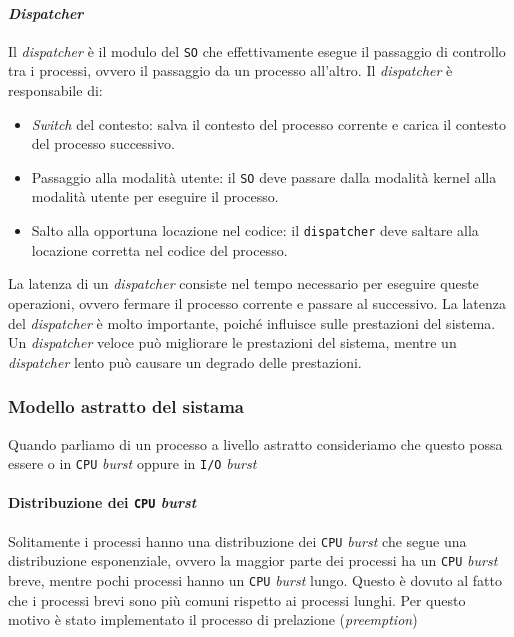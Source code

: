     \paragraph{\textit{Dispatcher}} Il \textit{dispatcher} è il modulo del \texttt{SO} che effettivamente esegue il passaggio di controllo tra i processi, ovvero il passaggio da un processo all'altro. Il \textit{dispatcher} è responsabile di:
    \begin{itemize}
        \item \textit{Switch} del contesto: salva il contesto del processo corrente e carica il contesto del processo successivo.
        \item Passaggio alla modalità utente: il \texttt{SO} deve passare dalla modalità kernel alla modalità utente per eseguire il processo.
        \item Salto alla opportuna locazione nel codice: il \texttt{dispatcher} deve saltare alla locazione corretta nel codice del processo.
    \end{itemize}
    La latenza di un \textit{dispatcher} consiste nel tempo necessario per eseguire queste operazioni, ovvero fermare il processo corrente e passare al successivo. La latenza del \textit{dispatcher} è molto importante, poiché influisce sulle prestazioni del sistema. Un \textit{dispatcher} veloce può migliorare le prestazioni del sistema, mentre un \textit{dispatcher} lento può causare un degrado delle prestazioni.
    \subsubsection{Modello astratto del sistama} 
        Quando parliamo di un processo a livello astratto consideriamo che questo possa essere o in \texttt{CPU} \textit{burst} oppure in \texttt{I/O} \textit{burst}
        \paragraph{Distribuzione dei \texttt{CPU} \textit{burst}} Solitamente i processi hanno una distribuzione dei \texttt{CPU} \textit{burst} che segue una distribuzione esponenziale, ovvero la maggior parte dei processi ha un \texttt{CPU} \textit{burst} breve, mentre pochi processi hanno un \texttt{CPU} \textit{burst} lungo. Questo è dovuto al fatto che i processi brevi sono più comuni rispetto ai processi lunghi. Per questo motivo è stato implementato il processo di prelazione (\textit{preemption})
